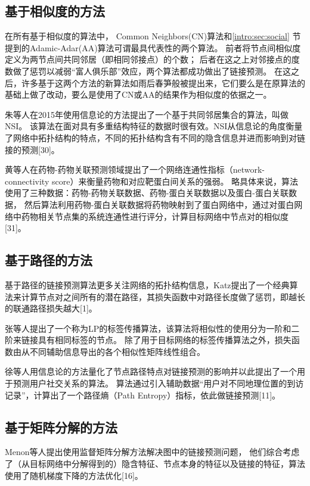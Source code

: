 \subsection{基于相似度的方法}
在所有基于相似度的算法中，
Common Neighbors(CN)算法和\ref{intro:sec:social} 节提到的Adamic-Adar(AA)算法可谓最具代表性的两个算法。
前者将节点间相似度定义为两节点间共同邻居（即相同邻接点）的个数；
后者在这之上对邻接点的度数做了惩罚以减弱“富人俱乐部”效应，两个算法都成功做出了链接预测。
在这之后，许多基于这两个方法的新算法如雨后春笋般被提出来，它们要么是在原算法的基础上做了改动，要么是使用了CN或AA的结果作为相似度的依据之一。


朱等人在2015年使用信息论的方法提出了一个基于共同邻居集合的算法，叫做NSI。
该算法在面对具有多重结构特征的数据时很有效。NSI从信息论的角度衡量了网络中拓扑结构的特点，不同的拓扑结构含有不同的隐含信息并进而影响到对链接的预测[30]。


黄等人在药物-药物关联预测领域提出了一个网络连通性指标（network-connectivity score）来衡量药物和对应靶蛋白间关系的强弱。
略具体来说，算法使用了三种数据：药物-药物关联数据、药物-蛋白关联数据以及蛋白-蛋白关联数据，
然后算法利用药物-蛋白关联数据将药物映射到了蛋白网络中，通过对蛋白网络中药物相关节点集的系统连通性进行评分，计算目标网络中节点对的相似度[31]。


\subsection{基于路径的方法}
基于路径的链接预测算法更多关注网络的拓扑结构信息，Katz提出了一个经典算法来计算节点对之间所有的潜在路径，其损失函数中对路径长度做了惩罚，即越长的联通路径损失越大[1]。


张等人提出了一个称为LP的标签传播算法，该算法将相似性的使用分为一阶和二阶来链接具有相同标签的节点。
除了用于目标网络的标签传播算法之外，损失函数由从不同辅助信息导出的各个相似性矩阵线性组合。


徐等人用信息论的方法量化了节点路径特点对链接预测的影响并以此提出了一个用于预测用户社交关系的算法。
算法通过引入辅助数据“用户对不同地理位置的到访记录”，计算出了一个路径熵（Path Entropy）指标，依此做链接预测[11]。

\subsection{基于矩阵分解的方法}
Menon等人提出使用监督矩阵分解方法解决图中的链接预测问题，
他们综合考虑了（从目标网络中分解得到的）隐含特征、节点本身的特征以及链接的特征，算法使用了随机梯度下降的方法优化[16]。


